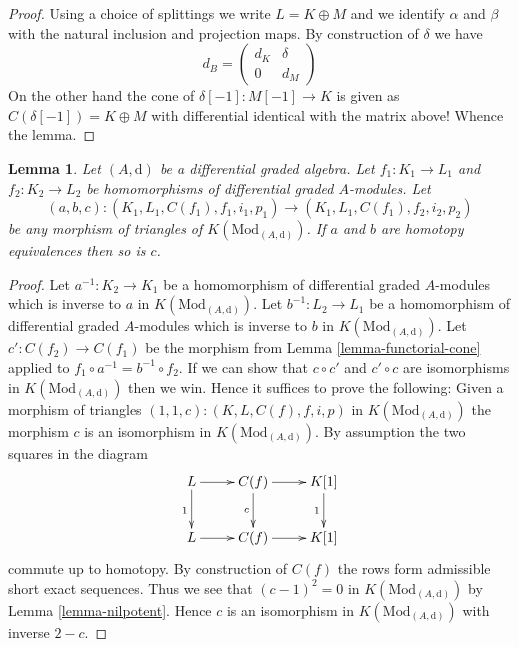 \documentclass{stacks-project}
\theoremstyle{plain}
\newtheorem{lemma}[subsection]{Lemma}
\theoremstyle{definition}
\theoremstyle{remark}
\numberwithin{equation}{subsection}
\begin{document}
\begin{proof}
Using a choice of splittings we write $L = K \oplus M$ and we identify
$\alpha$ and $\beta$ with the natural inclusion and projection maps.
By construction of $\delta$ we have
$$
d_B =
\left(
\begin{matrix}
d_K & \delta \\
0 & d_M
\end{matrix}
\right)
$$
On the other hand the cone of $\delta[-1] : M[-1] \to K$
is given as $C(\delta[-1]) = K \oplus M$ with differential identical
with the matrix above! Whence the lemma.
\end{proof}

\begin{lemma}
\label{lemma-third-isomorphism}
Let $(A, \text{d})$ be a differential graded algebra.
Let $f_1 : K_1 \to L_1$ and $f_2 : K_2 \to L_2$ be homomorphisms of
differential graded $A$-modules. Let
$$
(a, b, c) :
(K_1, L_1, C(f_1), f_1, i_1, p_1)
\longrightarrow
(K_1, L_1, C(f_1), f_2, i_2, p_2)
$$
be any morphism of triangles of $K(\text{Mod}_{(A, \text{d})})$.
If $a$ and $b$ are homotopy equivalences then so is $c$.
\end{lemma}

\begin{proof}
Let $a^{-1} : K_2 \to K_1$ be a homomorphism of differential graded $A$-modules
which is inverse to $a$ in $K(\text{Mod}_{(A, \text{d})})$.
Let $b^{-1} : L_2 \to L_1$ be a homomorphism of differential graded $A$-modules
which is inverse to $b$ in $K(\text{Mod}_{(A, \text{d})})$.
Let $c' : C(f_2) \to C(f_1)$ be the morphism from
Lemma \ref{lemma-functorial-cone} applied to
$f_1 \circ a^{-1} = b^{-1} \circ f_2$.
If we can show that $c \circ c'$ and $c' \circ c$ are isomorphisms in
$K(\text{Mod}_{(A, \text{d})})$
then we win. Hence it suffices to prove the following: Given
a morphism of triangles
$(1, 1, c) : (K, L, C(f), f, i, p)$
in $K(\text{Mod}_{(A, \text{d})})$ the morphism $c$ is an isomorphism
in $K(\text{Mod}_{(A, \text{d})})$.
By assumption the two squares in the diagram
$$
\xymatrix{
L \ar[r] \ar[d]_1 &
C(f) \ar[r] \ar[d]_c &
K[1] \ar[d]_1 \\
L \ar[r] &
C(f) \ar[r] &
K[1]
}
$$
commute up to homotopy. By construction of $C(f)$ the rows
form admissible short exact sequences. Thus we see that
$(c - 1)^2 = 0$ in $K(\text{Mod}_{(A, \text{d})})$ by
Lemma \ref{lemma-nilpotent}.
Hence $c$ is an isomorphism in $K(\text{Mod}_{(A, \text{d})})$
with inverse $2 - c$.
\end{proof}
\end{document}
